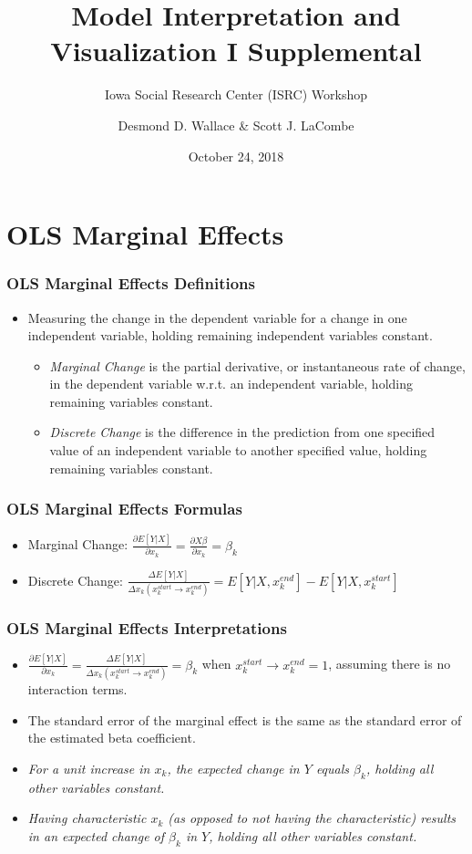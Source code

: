 \documentclass{beamer}
\title[Model Interpretation and Visualization I]{Model Interpretation and Visualization I Supplemental}
\subtitle[ISRC Workshop]{Iowa Social Research Center (ISRC) Workshop}
\author[Wallace \& LaCombe]{Desmond D. Wallace \& Scott J. LaCombe}
\institute[University of Iowa]{Department of Political Science\\The University of Iowa\\Iowa City, IA}
\date{October 24, 2018}
\begin{document}
\begin{frame}
 \titlepage
\end{frame}

\section{OLS Marginal Effects}

\begin{frame}
	\frametitle{OLS Marginal Effects Definitions}
		\begin{itemize}
			\item Measuring the change in the dependent variable for a change in one independent variable, holding remaining independent variables constant.
				\begin{itemize}
					\item \textit{Marginal Change} is the partial derivative, or instantaneous rate of change, in the dependent variable w.r.t. an independent variable, holding remaining variables constant.
					\item \textit{Discrete Change} is the difference in the prediction from one specified value of an independent variable to another specified value, holding remaining variables constant.
				\end{itemize}
		\end{itemize}
\end{frame}

\begin{frame}
	\frametitle{OLS Marginal Effects Formulas}
		\begin{itemize}
			\item Marginal Change: $\frac{\partial E[Y|X]}{\partial x_{k}}=\frac{\partial X\beta}{\partial x_{k}}=\beta_{k}$
			\item Discrete Change: $\frac{\Delta E[Y|X]}{\Delta x_{k}\left(x^{start}_{k}\rightarrow x^{end}_{k}\right)}=E[Y|X, x^{end}_{k}]-E[Y|X, x^{start}_{k}]$
		\end{itemize}
\end{frame}

\begin{frame}
	\frametitle{OLS Marginal Effects Interpretations}
		\begin{itemize}
			\item $\frac{\partial E[Y|X]}{\partial x_{k}}=\frac{\Delta E[Y|X]}{\Delta x_{k}\left(x^{start}_{k}\rightarrow x^{end}_{k}\right)}=\beta_{k}$ when $x^{start}_{k}\rightarrow x^{end}_{k}=1$, assuming there is no interaction terms.
			\item The standard error of the marginal effect is the same as the standard error of the estimated beta coefficient.
			\item \textit{For a unit increase in $x_{k}$, the expected change in $Y$ equals $\beta_{k}$, holding all other variables constant.}
			\item \textit{Having characteristic $x_{k}$ (as opposed to not having the characteristic) results in an expected change of $\beta_{k}$ in $Y$, holding all other variables constant.}
		\end{itemize}
\end{frame}
\end{document}

